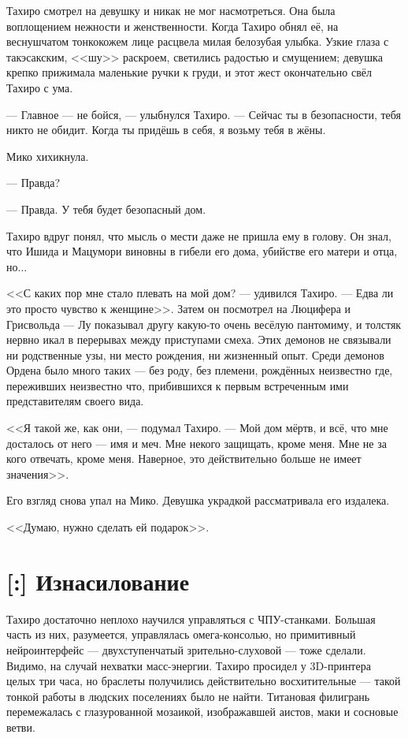 Тахиро смотрел на девушку и никак не мог насмотреться.
Она была воплощением нежности и женственности.
Когда Тахиро обнял её, на веснушчатом тонкокожем лице расцвела милая белозубая улыбка.
Узкие глаза с такэсакским, <<шу>> раскроем, светились радостью и смущением;
девушка крепко прижимала маленькие ручки к груди, и этот жест окончательно свёл Тахиро с ума.

--- Главное --- не бойся, --- улыбнулся Тахиро.
--- Сейчас ты в безопасности, тебя никто не обидит.
Когда ты придёшь в себя, я возьму тебя в жёны.

Мико хихикнула.

--- Правда?

--- Правда.
У тебя будет безопасный дом.

\textspace

Тахиро вдруг понял, что мысль о мести даже не пришла ему в голову.
Он знал, что Ишида и Мацумори виновны в гибели его дома, убийстве его матери и отца, но...

<<С каких пор мне стало плевать на мой дом? --- удивился Тахиро.
--- Едва ли это просто чувство к женщине>>.
Затем он посмотрел на Люцифера и Грисвольда --- Лу показывал другу какую-то очень весёлую пантомиму, и толстяк нервно икал в перерывах между приступами смеха.
Этих демонов не связывали ни родственные узы, ни место рождения, ни жизненный опыт.
Среди демонов Ордена было много таких --- без роду, без племени, рождённых неизвестно где, переживших неизвестно что, прибившихся к первым встреченным ими представителям своего вида.

<<Я такой же, как они, --- подумал Тахиро.
--- Мой дом мёртв, и всё, что мне досталось от него --- имя и меч.
Мне некого защищать, кроме меня.
Мне не за кого отвечать, кроме меня.
Наверное, это действительно больше не имеет значения>>.

Его взгляд снова упал на Мико.
Девушка украдкой рассматривала его издалека.

<<Думаю, нужно сделать ей подарок>>.

\section{[:] Изнасилование}

Тахиро достаточно неплохо научился управляться с ЧПУ-станками.
Большая часть из них, разумеется, управлялась омега-консолью, но примитивный нейроинтерфейс --- двухступенчатый зрительно-слуховой --- тоже сделали.
Видимо, на случай нехватки масс-энергии.
Тахиро просидел у 3D-принтера целых три часа, но браслеты получились действительно восхитительные --- такой тонкой работы в людских поселениях было не найти.
Титановая филигрань перемежалась с глазурованной мозаикой, изображавшей аистов, маки и сосновые ветви.

